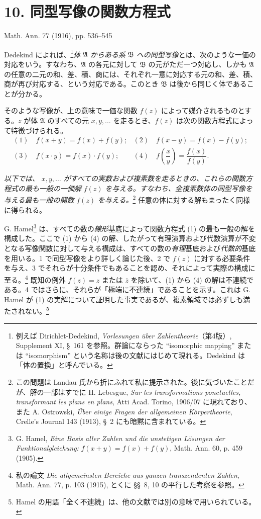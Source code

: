\section*{10. 同型写像の関数方程式}
\begin{center}
Math. Ann. 77 (1916), pp. 536--545
\end{center}

Dedekind によれば、\footnote{例えば Dirichlet-Dedekind, \emph{Vorlesungen über Zahlentheorie}（第4版）, Supplement XI, \S\ 161 を参照。群論にならった ``isomorphic mapping'' または ``isomorphism'' という名称は後の文献にはじめて現れる。Dedekind は「体の置換」と呼んでいる。}\emph{体} $\mathfrak A$ \emph{からある系} $\mathfrak B$ \emph{への同型写像}とは、次のような一価の対応をいう。すなわち、$\mathfrak A$ の各元に対して $\mathfrak B$ の元がただ一つ対応し、しかも $\mathfrak A$ の任意の二元の和、差、積、商には、それぞれ一意に対応する元の和、差、積、商が再び対応する、という対応である。このとき $\mathfrak B$ は後から同じく体であることが分かる。

そのような写像が、上の意味で一価な関数 $f(z)$ によって媒介されるものとする。$z$ が体 $\mathfrak A$ のすべての元 $x,y,\ldots$ を走るとき、$f(z)$ は次の関数方程式によって特徴づけられる。
\[
\begin{array}{ll}
(1)\quad f(x+y)=f(x)+f(y); & (2)\quad f(x-y)=f(x)-f(y);\\[0.45em]
(3)\quad f(x\cdot y)=f(x)\cdot f(y); & (4)\quad f\!\left(\dfrac{x}{y}\right)=\dfrac{f(x)}{f(y)}.
\end{array}
\]

\emph{以下では、} $x,y,\ldots$ \emph{がすべての実数および複素数を走るときの、これらの関数方程式の最も一般の一価解} $f(z)$ \emph{を与える。すなわち、全複素数体の同型写像を与える最も一般の関数} $f(z)$ \emph{を与える。}\footnote{この問題は Landau 氏から折にふれて私に提示された。後に気づいたことだが、解の一部はすでに H. Lebesgue, \emph{Sur les transformations ponctuelles, transformant les plans en plans}, Atti Acad. Torino, 1906/07 に現れており、また A. Ostrowski, \emph{Über einige Fragen der allgemeinen Körpertheorie}, Crelle's Journal 143 (1913), \S\ 2 にも暗黙に含まれている。} 任意の体に対する解もまったく同様に得られる。

G. Hamel\footnote{G. Hamel, \emph{Eine Basis aller Zahlen und die unstetigen Lösungen der Funktionalgleichung:} $f(x+y)=f(x)+f(y)$, Math. Ann. 60, p. 459 (1905).} は、すべての数の\emph{線形}基底によって関数方程式 (1) の最も一般の解を構成した。ここで (1) から (4) の解、したがって有理演算および代数演算が不変となる写像関数に対して与える構成は、すべての数の\emph{有理}基底および\emph{代数的}基底を用いる。1 で同型写像をより詳しく論じた後、2 で $f(z)$ に対する必要条件を与え、3 でそれらが十分条件でもあることを認め、それによって実際の構成に至る。\footnote{私の論文 \emph{Die allgemeinsten Bereiche aus ganzen transzendenten Zahlen}, Math. Ann. 77, p. 103 (1915), とくに \S\S\ 8, 10 の平行した考察を参照。} 既知の例外 $f(z)=z$ または $\overline z$ を除いて、(1) から (4) の解は不連続である。4 ではさらに、それらが「極端に不連続」であることを示す。これは G. Hamel が (1) の実解について証明した事実であるが、複素領域では必ずしも満たされない。\footnote{Hamel の用語「全く不連続」は、他の文献では別の意味で用いられている。}

